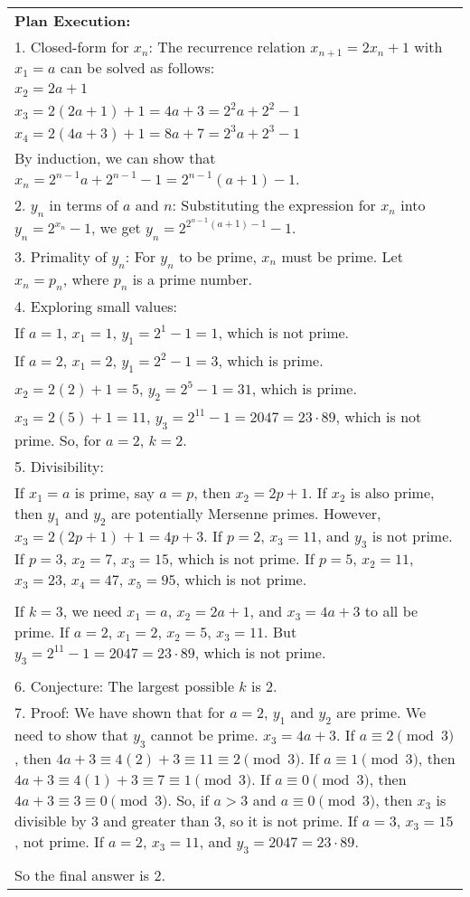 \begin{table*}
\begin{tabular}{p{\linewidth}}
\textbf{Plan Execution:}\\ 1. Closed-form for $x_n$: The recurrence relation $x_{n+1} = 2x_n + 1$ with $x_1 = a$ can be solved as follows:\\ $x_2 = 2a + 1$\\ $x_3 = 2(2a+1) + 1 = 4a + 3 = 2^2a + 2^2 - 1$\\ $x_4 = 2(4a+3) + 1 = 8a + 7 = 2^3a + 2^3 - 1$\\ By induction, we can show that $x_n = 2^{n-1}a + 2^{n-1} - 1 = 2^{n-1}(a+1) - 1$.\\ 2. $y_n$ in terms of $a$ and $n$: Substituting the expression for $x_n$ into $y_n = 2^{x_n} - 1$, we get $y_n = 2^{2^{n-1}(a+1) - 1} - 1$.\\ 3. Primality of $y_n$: For $y_n$ to be prime, $x_n$ must be prime.  Let $x_n = p_n$, where $p_n$ is a prime number.\\ 4. Exploring small values:\\ If $a=1$, $x_1 = 1$, $y_1 = 2^1 - 1 = 1$, which is not prime.\\ If $a=2$, $x_1 = 2$, $y_1 = 2^2 - 1 = 3$, which is prime.\\ $x_2 = 2(2) + 1 = 5$, $y_2 = 2^5 - 1 = 31$, which is prime.\\ $x_3 = 2(5) + 1 = 11$, $y_3 = 2^{11} - 1 = 2047 = 23 \cdot 89$, which is not prime.  So, for $a=2$, $k=2$.\\ 5. Divisibility:\\ If $x_1 = a$ is prime, say $a=p$, then $x_2 = 2p+1$.  If $x_2$ is also prime, then $y_1$ and $y_2$ are potentially Mersenne primes.  However, $x_3 = 2(2p+1)+1 = 4p+3$.  If $p=2$, $x_3 = 11$, and $y_3$ is not prime.  If $p=3$, $x_2 = 7$, $x_3 = 15$, which is not prime.  If $p=5$, $x_2 = 11$, $x_3 = 23$, $x_4 = 47$, $x_5 = 95$, which is not prime.\\ \\ If $k=3$, we need $x_1=a$, $x_2=2a+1$, and $x_3=4a+3$ to all be prime.  If $a=2$, $x_1=2$, $x_2=5$, $x_3=11$.  But $y_3 = 2^{11}-1 = 2047 = 23 \cdot 89$, which is not prime.\\ \\ 6. Conjecture: The largest possible $k$ is 2.\\ 7. Proof: We have shown that for $a=2$, $y_1$ and $y_2$ are prime.  We need to show that $y_3$ cannot be prime.  $x_3 = 4a+3$.  If $a \equiv 2 \pmod{3}$, then $4a+3 \equiv 4(2)+3 \equiv 11 \equiv 2 \pmod{3}$.  If $a \equiv 1 \pmod{3}$, then $4a+3 \equiv 4(1)+3 \equiv 7 \equiv 1 \pmod{3}$.  If $a \equiv 0 \pmod{3}$, then $4a+3 \equiv 3 \equiv 0 \pmod{3}$.  So, if $a>3$ and $a \equiv 0 \pmod{3}$, then $x_3$ is divisible by 3 and greater than 3, so it is not prime.  If $a=3$, $x_3 = 15$, not prime.  If $a=2$, $x_3 = 11$, and $y_3 = 2047 = 23 \cdot 89$.\\ \\ So the final answer is $\boxed{2}$. \\ \bottomrule

\end{tabular}
\end{table*}
